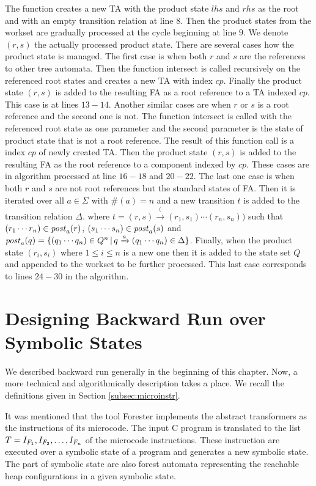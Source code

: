 The function creates a new TA with the product state $lhs$ and $rhs$ as the root
and with an empty transition relation at line $8$.
Then the product states from the workset are gradually processed at the cycle beginning
at line $9$.
We denote $(r,s)$ the actually processed product state.
There are several cases how the product state is managed.
The first case is when both $r$ and $s$ are the references to other
tree automata.
Then the function intersect is called recursively on the referenced
root states and creates a new TA with index $cp$.
Finally the product state $(r,s)$ is added to the resulting FA
as a root reference to a TA indexed $cp$.
This case is at lines $13-14$.
Another similar cases are when $r$ or $s$ is a root reference and the second one is not.
The function intersect is called with the referenced root state as one parameter
and the second parameter is the state of product state that is not a root reference.
The result of this function call is a index $cp$ of newly created TA.
Then the product state $(r,s)$ is added to the resulting FA as the root reference
to a component indexed by $cp$.
These cases are in algorithm processed at line $16-18$ and $20-22$.
The last one case is when both $r$ and $s$ are not root references
but the standard states of FA.
Then it is iterated over all $a \in \Sigma$ with $\#(a) = n$
and a new transition $t$ is added to the transition relation $\Delta$.
where $t = (r,s) \xrightarrow ((r_1,s_1) \cdots (r_n, s_n))$ such that
$(r_1 \cdots r_n) \in \mathit{post}_{a}(r)$, $(s_1 \cdots s_n) \in \mathit{post}_{a}(s)$ and
$\mathit{post}_{a}(q) = \{(q_1 \cdots q_n) \in Q^n\,|\, q \xrightarrow{a} (q_1 \cdots q_n) \in \Delta\}$.
Finally, when the product state $(r_i,s_i)$ where $1 \leq i \leq n$ is a new one
then it is added to the state set $Q$ and appended to the workset to be further processed.
This last case corresponds to lines $24-30$ in the algorithm.



\section{Designing Backward Run over Symbolic States}
\label{sec:brdesign}

We described backward run generally in the beginning of this chapter.
Now, a more technical and algorithmically description takes a place.
We recall the definitions given in Section \ref{subsec:microinstr}.

It was mentioned that the tool Forester implements the abstract
transformers as the instructions of its microcode.
The input C program is translated to the list $T=I_{F_{1}}, I_{F_{2}},\ldots, I_{F_{n}}$
of the microcode instructions.
These instruction are executed over a symbolic state of a program
and generates a new symbolic state.
The part of symbolic state are also forest automata representing
the reachable heap configurations in a given symbolic state.


